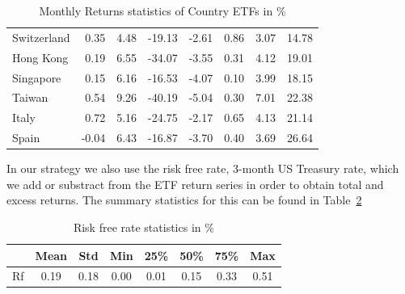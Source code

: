 \documentclass[a4paper,12pt,twoside]{article}
\begin{document}
\begin{table}[ht]
\begin{tabular}{lrrrrrrr}
Switzerland  & 0.35          & 4.48         & -19.13       & -2.61         & 0.86          & 3.07          & 14.78       \\
Hong Kong    & 0.19          & 6.55         & -34.07       & -3.55         & 0.31          & 4.12          & 19.01       \\
Singapore    & 0.15          & 6.16         & -16.53       & -4.07         & 0.10          & 3.99          & 18.15       \\
Taiwan       & 0.54          & 9.26         & -40.19       & -5.04         & 0.30          & 7.01          & 22.38       \\
Italy        & 0.72          & 5.16         & -24.75       & -2.17         & 0.65          & 4.13          & 21.14       \\
Spain        & -0.04         & 6.43         & -16.87       & -3.70         & 0.40          & 3.69          & 26.64       \\
\bottomrule
\end{tabular}
\caption{Monthly Returns statistics of Country ETFs in \%}
\label{tab:summary_stats_return}
\end{table}

In our strategy we also use the risk free rate, 3-month US Treasury rate, which we add or substract from the ETF return series in order to obtain total and excess returns. The summary statistics for this can be found in Table~\ref{tab:summary_stats_rf}

\begin{table}[ht]
\centering
\begin{tabular}{lccccccc}
\toprule
    & \textbf{Mean} & \textbf{Std} & \textbf{Min} & \textbf{25\%} & \textbf{50\%} & \textbf{75\%} & \textbf{Max} \\
\midrule
  Rf & 0.19 & 0.18 & 0.00 & 0.01 & 0.15 & 0.33 & 0.51 \\
\bottomrule
\end{tabular}
\caption{Risk free rate statistics in \% }
\label{tab:summary_stats_rf}
\end{table}


\newpage
\end{document}
